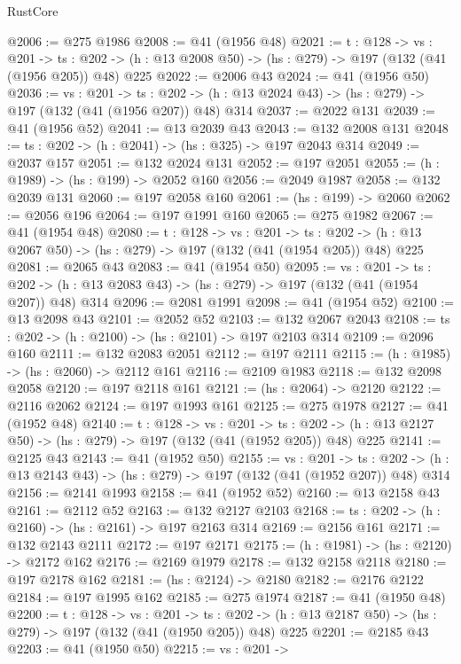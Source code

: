 \begin{lexlean}{RustCore}
\begin{coremodule}
@2006 := @275 @1986
@2008 := @41 (@1956 @48)
@2021 := {t : @128} ->
  {vs : @201} ->
  {ts : @202} -> (h : @13 @2008 @50) -> (hs : @279) -> @197 (@132 (@41 (@1956 @205)) @48) @225
@2022 := @2006 @43
@2024 := @41 (@1956 @50)
@2036 := {vs : @201} ->
  {ts : @202} -> (h : @13 @2024 @43) -> (hs : @279) -> @197 (@132 (@41 (@1956 @207)) @48) @314
@2037 := @2022 @131
@2039 := @41 (@1956 @52)
@2041 := @13 @2039 @43
@2043 := @132 @2008 @131
@2048 := {ts : @202} -> (h : @2041) -> (hs : @325) -> @197 @2043 @314
@2049 := @2037 @157
@2051 := @132 @2024 @131
@2052 := @197 @2051
@2055 := (h : @1989) -> (hs : @199) -> @2052 @160
@2056 := @2049 @1987
@2058 := @132 @2039 @131
@2060 := @197 @2058 @160
@2061 := (hs : @199) -> @2060
@2062 := @2056 @196
@2064 := @197 @1991 @160
@2065 := @275 @1982
@2067 := @41 (@1954 @48)
@2080 := {t : @128} ->
  {vs : @201} ->
  {ts : @202} -> (h : @13 @2067 @50) -> (hs : @279) -> @197 (@132 (@41 (@1954 @205)) @48) @225
@2081 := @2065 @43
@2083 := @41 (@1954 @50)
@2095 := {vs : @201} ->
  {ts : @202} -> (h : @13 @2083 @43) -> (hs : @279) -> @197 (@132 (@41 (@1954 @207)) @48) @314
@2096 := @2081 @1991
@2098 := @41 (@1954 @52)
@2100 := @13 @2098 @43
@2101 := @2052 @52
@2103 := @132 @2067 @2043
@2108 := {ts : @202} -> (h : @2100) -> (hs : @2101) -> @197 @2103 @314
@2109 := @2096 @160
@2111 := @132 @2083 @2051
@2112 := @197 @2111
@2115 := (h : @1985) -> (hs : @2060) -> @2112 @161
@2116 := @2109 @1983
@2118 := @132 @2098 @2058
@2120 := @197 @2118 @161
@2121 := (hs : @2064) -> @2120
@2122 := @2116 @2062
@2124 := @197 @1993 @161
@2125 := @275 @1978
@2127 := @41 (@1952 @48)
@2140 := {t : @128} ->
  {vs : @201} ->
  {ts : @202} -> (h : @13 @2127 @50) -> (hs : @279) -> @197 (@132 (@41 (@1952 @205)) @48) @225
@2141 := @2125 @43
@2143 := @41 (@1952 @50)
@2155 := {vs : @201} ->
  {ts : @202} -> (h : @13 @2143 @43) -> (hs : @279) -> @197 (@132 (@41 (@1952 @207)) @48) @314
@2156 := @2141 @1993
@2158 := @41 (@1952 @52)
@2160 := @13 @2158 @43
@2161 := @2112 @52
@2163 := @132 @2127 @2103
@2168 := {ts : @202} -> (h : @2160) -> (hs : @2161) -> @197 @2163 @314
@2169 := @2156 @161
@2171 := @132 @2143 @2111
@2172 := @197 @2171
@2175 := (h : @1981) -> (hs : @2120) -> @2172 @162
@2176 := @2169 @1979
@2178 := @132 @2158 @2118
@2180 := @197 @2178 @162
@2181 := (hs : @2124) -> @2180
@2182 := @2176 @2122
@2184 := @197 @1995 @162
@2185 := @275 @1974
@2187 := @41 (@1950 @48)
@2200 := {t : @128} ->
  {vs : @201} ->
  {ts : @202} -> (h : @13 @2187 @50) -> (hs : @279) -> @197 (@132 (@41 (@1950 @205)) @48) @225
@2201 := @2185 @43
@2203 := @41 (@1950 @50)
@2215 := {vs : @201} ->

\end{coremodule}
\end{lexlean}
